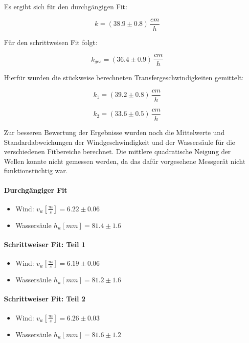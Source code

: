 \documentclass[12pt]{article}
\begin{document}
 Es ergibt sich für den durchgängigen Fit:

\begin{equation}
	k = (38.9 \pm 0.8)\, \frac{cm}{h}
\end{equation}

Für den schrittweisen Fit folgt:

\begin{equation}
k_{ges} = (36.4 \pm 0.9)\, \frac{cm}{h}
\end{equation}

Hierfür wurden die stückweise berechneten Transfergeschwindigkeiten gemittelt:

\begin{equation}
k_1 = (39.2 \pm 0.8)\, \frac{cm}{h}
\end{equation}

\begin{equation}
	k_2 = (33.6 \pm 0.5)\, \frac{cm}{h}
\end{equation}

Zur besseren Bewertung der Ergebnisse wurden noch die Mittelwerte und Standardabweichungen der Windgeschwindigkeit und der Wassersäule für die verschiedenen Fitbereiche berechnet. Die mittlere quadratische Neigung der Wellen konnte nicht gemessen werden, da das dafür vorgesehene Messgerät nicht funktionstüchtig war.

\paragraph{Durchgängiger Fit}
\begin{itemize}
	\item Wind: $v_w [\frac{m}{s}] = 6.22 \pm 0.06 $
	\item Wassersäule $h_w[mm] = 81.4 \pm 1.6 $
\end{itemize}
\paragraph{Schrittweiser Fit: Teil 1}
\begin{itemize}
	\item Wind: $v_w [\frac{m}{s}] = 6.19 \pm 0.06 $
	\item Wassersäule $h_w[mm] = 81.2 \pm 1.6 $
\end{itemize}
\paragraph{Schrittweiser Fit: Teil 2}
\begin{itemize}
	\item Wind: $v_w [\frac{m}{s}] = 6.26 \pm 0.03 $
	\item Wassersäule $h_w[mm] = 81.6 \pm 1.2 $
\end{itemize}
\end{document}

